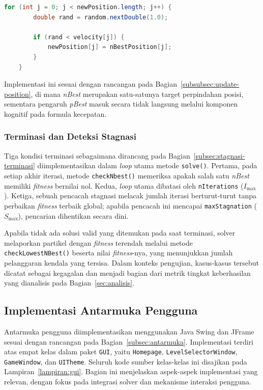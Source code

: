 \begin{lstlisting}[language=Java, caption=Pembaruan posisi diskrit berbasis probabilitas, label={lst:position-update}]
	for (int j = 0; j < newPosition.length; j++) {
		double rand = random.nextDouble(1.0);
		
		if (rand < velocity[j]) {
			newPosition[j] = nBestPosition[j];
		}
	}
\end{lstlisting}

Implementasi ini sesuai dengan rancangan pada Bagian~\ref{subsubsec:update-position}, di mana \textit{nBest} merupakan satu-satunya target perpindahan posisi, sementara pengaruh \textit{pBest} masuk secara tidak langsung melalui komponen kognitif pada formula kecepatan.

\subsubsection{Terminasi dan Deteksi Stagnasi}

Tiga kondisi terminasi sebagaimana dirancang pada Bagian~\ref{subsec:stagnasi-terminasi} diimplementasikan dalam \textit{loop} utama metode \texttt{solve()}. Pertama, pada setiap akhir iterasi, metode \texttt{checkNbest()} memeriksa apakah salah satu \textit{nBest} memiliki \textit{fitness} bernilai nol. Kedua, \textit{loop} utama dibatasi oleh \texttt{nIterations} ($I_{\max}$). Ketiga, sebuah pencacah stagnasi melacak jumlah iterasi berturut-turut tanpa perbaikan \textit{fitness} terbaik global; apabila pencacah ini mencapai \texttt{maxStagnation} ($S_{\max}$), pencarian dihentikan secara dini.

Apabila tidak ada solusi valid yang ditemukan pada saat terminasi, solver melaporkan partikel dengan \textit{fitness} terendah melalui metode \texttt{checkLowestNBest()} beserta nilai \textit{fitness}-nya, yang menunjukkan jumlah pelanggaran kendala yang tersisa. Dalam konteks pengujian, kasus-kasus tersebut dicatat sebagai kegagalan dan menjadi bagian dari metrik tingkat keberhasilan yang dianalisis pada Bagian~\ref{sec:analisis}.

\subsection{Implementasi Antarmuka Pengguna}
\label{subsec:impl-antarmuka}

Antarmuka pengguna diimplementasikan menggunakan Java Swing dan JFrame sesuai dengan rancangan pada Bagian~\ref{subsec:antarmuka}. Implementasi terdiri atas empat kelas dalam paket \texttt{GUI}, yaitu \texttt{Homepage}, \texttt{LevelSelectorWindow}, \texttt{GameWindow}, dan \texttt{UITheme}. Seluruh kode sumber kelas-kelas ini disajikan pada Lampiran~\ref{lampiran:gui}. Bagian ini menjelaskan aspek-aspek implementasi yang relevan, dengan fokus pada integrasi solver dan mekanisme interaksi pengguna.

